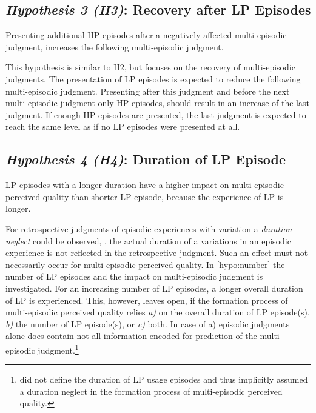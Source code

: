 
\subsection*{\emph{Hypothesis 3 (H3)}: Recovery after \acl{LP} Episodes}
\begin{hypothesis}[H3]\label{hypo:recovery}
Presenting additional \ac{HP} episodes after a negatively affected multi-episodic judgment, increases the following multi-episodic judgment.
\end{hypothesis}

This hypothesis is similar to H2, but focuses on the recovery of multi-episodic judgments.
The presentation of \ac{LP} episodes is expected to reduce the following multi-episodic judgment.
Presenting after this judgment and before the next multi-episodic judgment only \ac{HP} episodes, should result in an increase of the last judgment.
If enough \ac{HP} episodes are presented, the last judgment is expected to reach the same level as if no \ac{LP} episodes were presented at all.


\subsection*{\emph{Hypothesis 4 (H4)}: Duration of \acl{LP} Episode}
\begin{hypothesis}[H4]\label{hypo:duration}
\ac{LP} episodes with a longer duration have a higher impact on multi-episodic perceived quality than shorter \ac{LP} episode, because the experience of \ac{LP} is longer.
\end{hypothesis}

For retrospective judgments of episodic experiences with variation a \emph{duration neglect} could be observed, \ie, the actual duration of a variations in an episodic experience is not reflected in the retrospective judgment.
Such an effect must not necessarily occur for multi-episodic perceived quality.
In \autoref{hypo:number} the number of \ac{LP} episodes and the impact on multi-episodic judgment is investigated.
For an increasing number of \ac{LP} episodes, a longer overall duration of \ac{LP} is experienced.
This, however, leaves open, if the formation process of multi-episodic perceived quality relies \emph{a)} on the overall duration of \ac{LP} episode(s), \emph{b)} the number of \ac{LP} episode(s), or \emph{c)} both.
In case of a) episodic judgments alone does contain not all information encoded for prediction of the multi-episodic judgment.\footnote{\cite[p. 2]{moller_single-call_2011} did not define the duration of \ac{LP} usage episodes and thus implicitly assumed a duration neglect in the formation process of multi-episodic perceived quality.}

